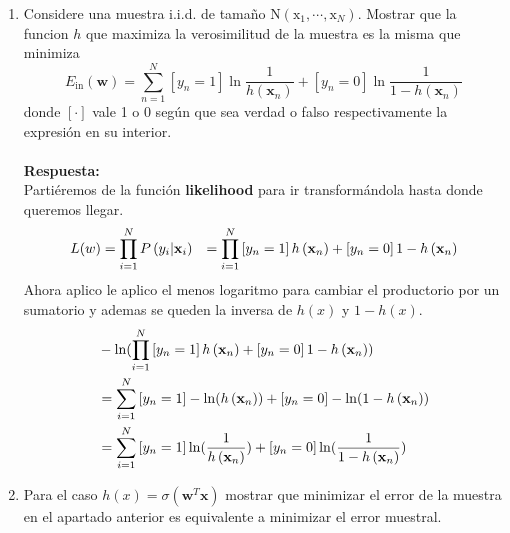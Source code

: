 \documentclass[12pt,a4paper]{article}
\begin{document}
\begin{enumerate}
	\begin{enumerate}
		\item  Considere  una muestra i.i.d. de tamaño $\mathrm{N}\left(\mathrm{x}_{1}, \cdots, \mathrm{x}_{N}\right)$. Mostrar que la funcion $h$ que maximiza la verosimilitud de la muestra es la misma que minimiza
		$$E_{\mathrm{in}}(\mathbf{w})=\sum_{n=1}^{N}\left[y_{n}=1\right] \ln \frac{1}{h\left(\mathbf{x}_{n}\right)}+\left[y_{n}=0\right] \ln \frac{1}{1-h\left(\mathbf{x}_{n}\right)}$$ donde $[\cdot]$ vale 1 o 0 según que sea verdad o falso respectivamente la expresión en su interior.\\\\\textbf{Respuesta: }\\
		Partiéremos de la función \textbf{likelihood} para ir transformándola hasta donde queremos llegar.
		\begin{equation}
		\begin{aligned}
		\begin{split}
		\notag
			L(w) &=\prod_{i=1}^{N} P\left(y_{i} | \mathbf{x}_{i}\right) &= \prod_{i=1}^{N} \left[y_{n}=1\right] h\left(\mathbf{x}_{n}\right)+ \left[y_{n}=0\right] 1-h\left(\mathbf{x}_{n}\right)
		\end{split}
		\end{aligned}
		\end{equation}
		Ahora aplico le aplico el menos logaritmo para cambiar el productorio por un sumatorio y ademas se queden la inversa de $h(x)$ y $1-h(x)$.
				\begin{equation}
		\begin{aligned}
		\begin{split}
		\notag
		 &-\ln(\prod_{i=1}^{N} \left[y_{n}=1\right] h\left(\mathbf{x}_{n}\right)  +  \left[y_{n}=0\right] 1-h\left(\mathbf{x}_{n}\right)) \\ &= \sum_{i=1}^{N} \left[y_{n}=1\right] -\ln(h\left(\mathbf{x}_{n}\right)) +  \left[y_{n}=0\right] -\ln(1-h\left(\mathbf{x}_{n}\right)) \\ 
		 &= \sum_{i=1}^{N} \left[y_{n}=1\right] \ln(\frac{1}{h\left(\mathbf{x}_{n}\right)}) +  \left[y_{n}=0\right] \ln(\frac{1}{1-h\left(\mathbf{x}_{n}\right)})
		\end{split}
		\end{aligned}
		\end{equation}
		\item Para el caso $h(x)=\sigma\left(\mathbf{w}^{T} \mathbf{x}\right)$ mostrar que minimizar el error de la muestra en el apartado anterior es equivalente a minimizar el error muestral. 

\end{enumerate}
\end{enumerate}
\end{document}
